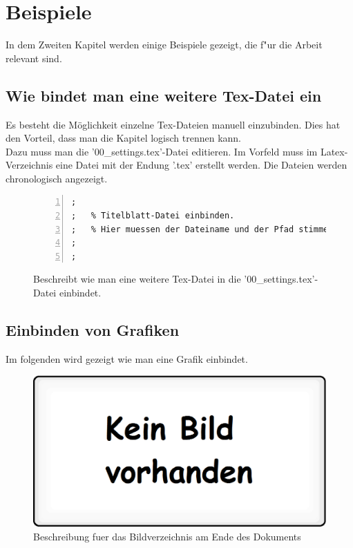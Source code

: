 \chapter{Beispiele}
\label{chap:Beispiele}
In dem Zweiten Kapitel werden einige Beispiele gezeigt, die f"ur die Arbeit relevant sind.


\section{Wie bindet man eine weitere Tex-Datei ein}
\label{sec:tex-dateiEinfuegen}
Es besteht die Möglichkeit einzelne Tex-Dateien manuell einzubinden. Dies hat den Vorteil, dass man die Kapitel logisch trennen kann.\\

Dazu muss man die '00\_settings.tex'-Datei editieren. Im Vorfeld muss im Latex-Verzeichnis eine Datei mit der Endung '.tex' erstellt werden.  Die Dateien werden chronologisch angezeigt.

\FloatBarrier
\begin{figure}[htb]
\begin{lstlisting}[backgroundcolor={\color{white}},
basicstyle={\normalsize\sffamily},
breaklines=true,
frame={bottomline,topline, rightline},
language=HTML,
numbers=left,
showstringspaces=false,
xleftmargin=22pt]	
;
;	% Titelblatt-Datei einbinden. 
;	% Hier muessen der Dateiname und der Pfad stimmen!
;	
;           
\end{lstlisting}
  \caption[Beispiel wie eine Tex-Datei eingebunden wird.]{Beschreibt wie man eine weitere Tex-Datei in die '00\_settings.tex'-Datei einbindet.}
\label{lst:Tex-DateienEinbinden}
\end{figure}


\section{Einbinden von Grafiken}
\label{sec:EinbindenVonGrafiken}
Im folgenden wird gezeigt wie man eine Grafik einbindet.

\FloatBarrier
\begin{figure}[htb]
  \centering  
  \includegraphics[scale=0.3]{img/kein_bild_vorhanden.eps}
  \caption[Beispiel wie eine Grafik eingebunden wird.]{Beschreibung fuer das Bildverzeichnis am Ende des Dokuments} 
  \label{fig:kein_bild_vorhanden}
\end{figure}

